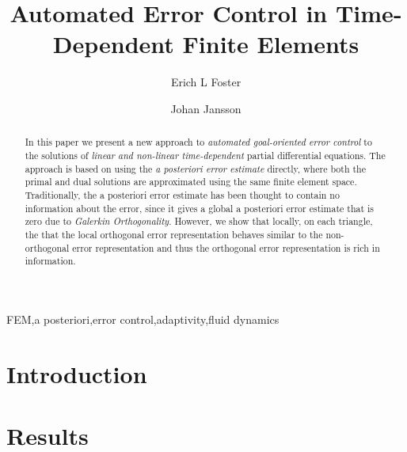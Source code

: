\documentclass[a4paper]{elsarticle}
\begin{document}
  \begin{frontmatter}
    \author[BCAM]{Erich L Foster}

    \author[BCAM,KTH]{Johan Jansson}

    \address[BCAM]{Basque Center for Applied Mathematics, Bilbao, Basque Country -- Spain}

    \address[KTH]{CSC, KTH Royal Institute of Technology, Stockholm, Sweden}

    \title{Automated Error Control in Time-Dependent Finite Elements}

    \begin{abstract}
      In this paper we present a new approach to \emph{automated goal-oriented
      error control} to the solutions of \emph{linear and non-linear
      time-dependent} partial differential equations. The approach is based
      on using the \emph{a posteriori error estimate} directly, where both the
      primal and dual solutions are approximated using the same finite element
      space.  Traditionally, the a posteriori error estimate has been thought to
      contain no information about the error, since it gives a global a
      posteriori error estimate that is zero due to \emph{Galerkin
      Orthogonality}. However, we show that locally, on each triangle, the that
      the local orthogonal error representation behaves similar to the
      non-orthogonal error representation and thus the orthogonal error
      representation is rich in information.
    \end{abstract}
    \begin{keyword}
      FEM\sep a posteriori\sep error control\sep adaptivity\sep fluid dynamics
    \end{keyword}
  \end{frontmatter}

  \section{Introduction} \label{sec:Intro}
  

  \section{Results} \label{sec:Results}
  
\end{document}
